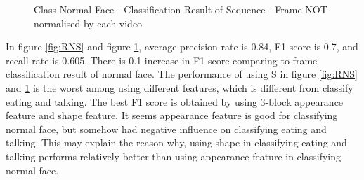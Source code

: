 \begin{figure}[ht]
\begin{minipage}{.5\textwidth}
  \caption{Class Normal Face - Classification Result of Sequence - Frame NOT normalised by each video}
  \label{fig:RNS1}
\end{minipage}
\end{figure}
\newline
In figure \ref{fig:RNS} and figure \ref{fig:RNS1}, average precision rate is 0.84, F1 score is 0.7, and recall rate is 0.605. There is 0.1 increase in F1 score comparing to frame classification result of normal face. The performance of using  S in figure \ref{fig:RNS} and \ref{fig:RNS1} is the worst among using different features, which is different from classify eating and talking. The best F1 score is obtained by using 3-block appearance feature and shape feature. It seems appearance feature is good for classifying normal face, but somehow had negative influence on classifying eating and talking. This may explain the reason why, using shape in classifying eating and talking performs relatively better than using appearance feature in classifying normal face.
